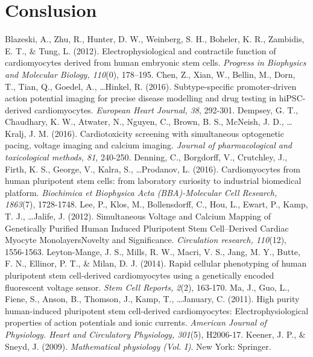 \documentclass[12pt,a4paper]{article}
\begin{document}
\section{Conslusion} \label{Conclusion}
%
\begin{thebibliography}{99}
 Blazeski, A., Zhu, R., Hunter, D. W., Weinberg, S. H., Boheler, K. R., Zambidis, E. T., \& Tung, L. (2012). Electrophysiological and contractile function of cardiomyocytes derived from human embryonic stem cells. \textit{Progress in Biophysics and Molecular Biology, 110}(0), 178–195.
 Chen, Z., Xian, W., Bellin, M., Dorn, T., Tian, Q., Goedel, A., \ldots Hinkel, R. (2016). Subtype-specific promoter-driven action potential imaging for precise disease modelling and drug testing in hiPSC-derived cardiomyocytes. \textit{European Heart Journal, 38}, 292-301.
 Dempsey, G. T., Chaudhary, K. W., Atwater, N., Nguyen, C., Brown, B. S., McNeish, J. D., \ldots Kralj, J. M. (2016). Cardiotoxicity screening with simultaneous optogenetic pacing, voltage imaging and calcium imaging. \textit{Journal of pharmacological and toxicological methods, 81}, 240-250.
 Denning, C., Borgdorff, V., Crutchley, J., Firth, K. S., George, V., Kalra, S., \ldots Prodanov, L. (2016). Cardiomyocytes from human pluripotent stem cells: from laboratory curiosity to industrial biomedical platform. \textit{Biochimica et Biophysica Acta (BBA)-Molecular Cell Research, 1863}(7), 1728-1748.
 Lee, P., Klos, M., Bollensdorff, C., Hou, L., Ewart, P., Kamp, T. J., \ldots Jalife, J. (2012). Simultaneous Voltage and Calcium Mapping of Genetically Purified Human Induced Pluripotent Stem Cell–Derived Cardiac Myocyte MonolayersNovelty and Significance. \textit{Circulation research, 110}(12), 1556-1563.
 Leyton-Mange, J. S., Mills, R. W., Macri, V. S., Jang, M. Y., Butte, F. N., Ellinor, P. T., \& Milan, D. J. (2014). Rapid cellular phenotyping of human pluripotent stem cell-derived cardiomyocytes using a genetically encoded fluorescent voltage sensor. \textit{Stem Cell Reports, 2}(2), 163-170.
 Ma, J., Guo, L., Fiene, S., Anson, B., Thomson, J., Kamp, T., \ldots January, C. (2011). High purity human-induced pluripotent stem cell-derived cardiomyocytes: Electrophysiological properties of action potentials and ionic currents. \textit{American Journal of Physiology. Heart and Circulatory Physiology, 301}(5), H2006-17.
 Keener, J. P., \& Sneyd, J. (2009). \textit{Mathematical physiology (Vol. I)}. New York: Springer.

\end{thebibliography}
\end{document}
